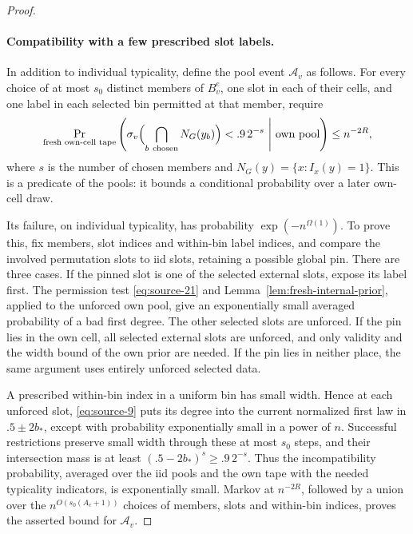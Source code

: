 \begin{proof}\leavevmode\par
\paragraph{Compatibility with a few prescribed slot labels.}
In addition to individual typicality, define the pool event
\(\mathcal A_v\) as follows. For every choice of at most \(s_0\)
distinct members of \(B_v^e\), one slot in each of their cells, and one
label in each selected bin permitted at that member, require
\[
 \Pr_{\text{fresh own-cell tape}}
 \left(\sigma_v\Bigl(\bigcap_{b\ {\rm chosen}}N_G(y_b)\Bigr)
                       <.9\,2^{-s}\ \middle|\ \text{own pool}\right)
       \le n^{-2R},
\]
where \(s\) is the number of chosen members and
\(N_G(y)=\{x:I_x(y)=1\}\). This is a predicate of the
pools: it bounds a conditional probability over a later own-cell draw.

Its failure, on individual typicality, has probability
\(\exp(-n^{\Omega(1)})\). To prove this, fix members, slot indices and
within-bin label indices, and compare the involved permutation slots to
iid slots, retaining a possible global pin. There are three cases. If the
pinned slot is one of the selected external slots, expose its label first.
The permission test \eqref{eq:source-21} and
Lemma~\ref{lem:fresh-internal-prior}, applied to the unforced own pool,
give an exponentially small averaged probability of a bad first degree.
The other selected slots are unforced. If the pin lies in the own cell,
all selected external slots are unforced, and only validity and the width
bound of the own prior are needed. If the pin lies in neither place, the
same argument uses entirely unforced selected data.

A prescribed within-bin index in a uniform bin has small width. Hence at
each unforced slot, \eqref{eq:source-9} puts its degree into the current
normalized first law in \(.5\pm2b_*\), except with probability
exponentially small in a power of \(n\). Successful restrictions preserve
small width through these at most \(s_0\) steps, and their intersection
mass is at least
\((.5-2b_*)^s\ge .9\,2^{-s}\). Thus the incompatibility probability,
averaged over the iid pools and the own tape with the needed typicality
indicators, is exponentially small. Markov at \(n^{-2R}\), followed by
a union over the \(n^{O(s_0(A_c+1))}\) choices of members, slots and
within-bin indices, proves the asserted bound for \(\mathcal A_v\).


\end{proof}
